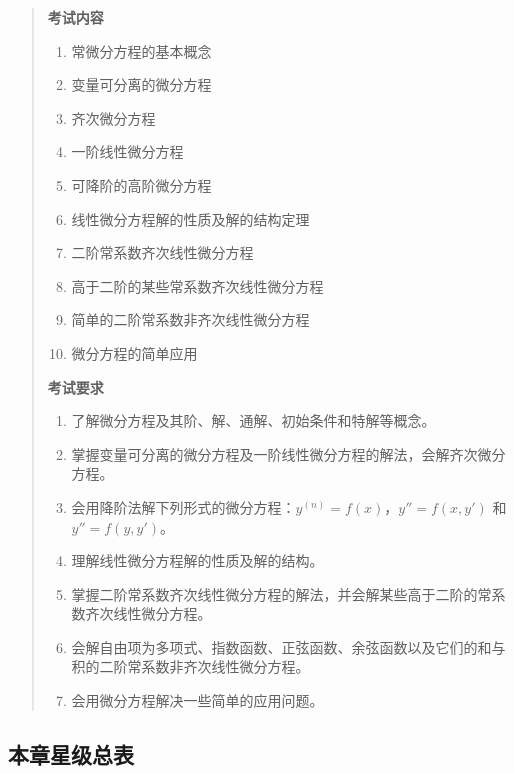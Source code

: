 \documentclass[11pt,openany,UTF8]{ctexbook}
\begin{document}
\begin{quote}
\textbf{考试内容}

\begin{enumerate}
\item 常微分方程的基本概念
\item 变量可分离的微分方程
\item 齐次微分方程
\item 一阶线性微分方程
\item 可降阶的高阶微分方程
\item 线性微分方程解的性质及解的结构定理
\item 二阶常系数齐次线性微分方程
\item 高于二阶的某些常系数齐次线性微分方程
\item 简单的二阶常系数非齐次线性微分方程
\item 微分方程的简单应用
\end{enumerate}
\textbf{考试要求}

\begin{enumerate}
\item 了解微分方程及其阶、解、通解、初始条件和特解等概念。
\item 掌握变量可分离的微分方程及一阶线性微分方程的解法，会解齐次微分方程。
\item 会用降阶法解下列形式的微分方程：$y^{(n)}=f(x)$，$y''=f(x,y')$ 和 $y''=f(y,y')$。
\item 理解线性微分方程解的性质及解的结构。
\item 掌握二阶常系数齐次线性微分方程的解法，并会解某些高于二阶的常系数齐次线性微分方程。
\item 会解自由项为多项式、指数函数、正弦函数、余弦函数以及它们的和与积的二阶常系数非齐次线性微分方程。
\item 会用微分方程解决一些简单的应用问题。
\end{enumerate}
\end{quote}
\subsection*{本章星级总表}
\end{document}
